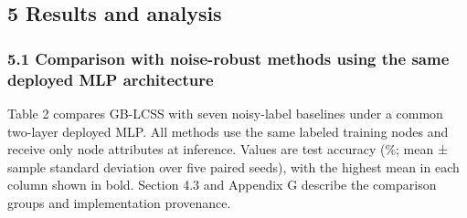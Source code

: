 \subsection{5 Results and analysis}\label{results-and-analysis}

\subsubsection{5.1 Comparison with noise-robust methods using the same deployed MLP architecture}\label{comparison-with-noise-robust-methods-using-the-same-deployed-mlp-architecture}

Table 2 compares GB-LCSS with seven noisy-label baselines under a common two-layer deployed MLP. All methods use the same labeled training nodes and receive only node attributes at inference. Values are test accuracy (\%; mean ± sample standard deviation over five paired seeds), with the highest mean in each column shown in bold. Section 4.3 and Appendix G describe the comparison groups and implementation provenance.

